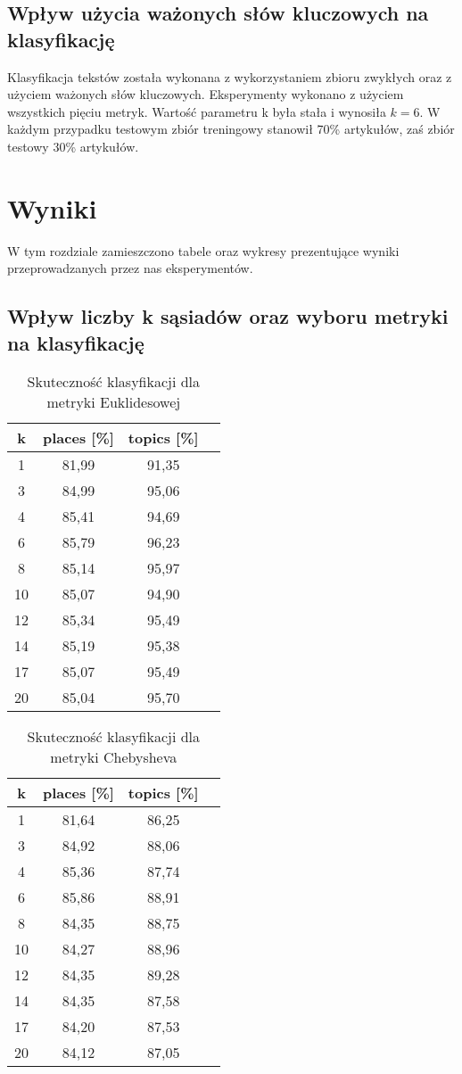 \documentclass{classrep}
\begin{document}
\subsection{Wpływ użycia ważonych słów kluczowych na klasyfikację}
Klasyfikacja tekstów została wykonana z wykorzystaniem zbioru zwykłych oraz z użyciem ważonych słów kluczowych. Eksperymenty wykonano z użyciem wszystkich pięciu metryk. Wartość parametru k była stała i wynosiła $k=6$. W każdym przypadku testowym zbiór treningowy stanowił 70\% artykułów, zaś zbiór testowy 30\% artykułów.

\section{Wyniki}
W tym rozdziale zamieszczono tabele oraz wykresy prezentujące wyniki przeprowadzanych przez nas eksperymentów.

\subsection{Wpływ liczby k sąsiadów oraz wyboru metryki na klasyfikację}

\begin{table}[H]
	\centering
	\begin{tabular}{c c c c} 
		\hline
		\textbf{k} & \textbf{places [\%]} & \textbf{topics [\%]} \\ [0.5ex] 
		\hline
		\hline 
1	& 81,99 &	91,35 \\
3	& 84,99 &	95,06 \\
4	& 85,41 & 94,69 \\
6	& 85,79 &	96,23 \\
8	&85,14 &	95,97 \\
10	&85,07&	94,90 \\
12	&85,34&	95,49 \\
14	&85,19&	95,38 \\
17	&85,07&	95,49 \\
20	&85,04&	95,70 \\
		\hline
	\end{tabular}
	\caption{Skuteczność klasyfikacji dla metryki Euklidesowej}
\end{table}

\begin{table}[H]
	\centering
	\begin{tabular}{c c c c} 
		\hline
		\textbf{k} & \textbf{places [\%]} & \textbf{topics [\%]} \\ [0.5ex] 
		\hline
		\hline 
1	&	81,64	&	86,25	\\
3	&	84,92	&	88,06	\\
4	&	85,36	&	87,74	\\
6	&	85,86	&	88,91	\\
8	&	84,35	&	88,75	\\
10	&	84,27	&	88,96	\\
12	&	84,35	&	89,28	\\
14	&	84,35	&	87,58	\\
17	&	84,20	&	87,53	\\
20	&	84,12	&	87,05	\\
		\hline
	\end{tabular}
	\caption{Skuteczność klasyfikacji dla metryki Chebysheva}
\end{table}
\end{document}
